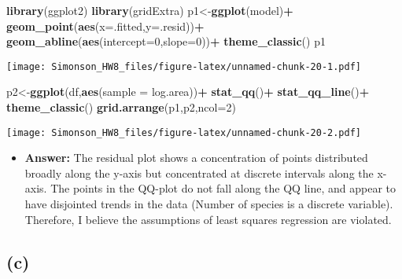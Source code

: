 \documentclass[]{article}
\newenvironment{Shaded}{\begin{snugshade}}{\end{snugshade}}
\newcommand{\KeywordTok}[1]{\textcolor[rgb]{0.13,0.29,0.53}{\textbf{#1}}}
\newcommand{\DataTypeTok}[1]{\textcolor[rgb]{0.13,0.29,0.53}{#1}}
\newcommand{\DecValTok}[1]{\textcolor[rgb]{0.00,0.00,0.81}{#1}}
\newcommand{\StringTok}[1]{\textcolor[rgb]{0.31,0.60,0.02}{#1}}
\newcommand{\OperatorTok}[1]{\textcolor[rgb]{0.81,0.36,0.00}{\textbf{#1}}}
\newcommand{\NormalTok}[1]{#1}
\providecommand{\tightlist}{%
  \setlength{\itemsep}{0pt}\setlength{\parskip}{0pt}}
\begin{document}
\begin{Shaded}
\begin{Highlighting}[]
\KeywordTok{library}\NormalTok{(ggplot2)}
\KeywordTok{library}\NormalTok{(gridExtra)}
\NormalTok{p1<-}\KeywordTok{ggplot}\NormalTok{(model)}\OperatorTok{+}
\StringTok{  }\KeywordTok{geom_point}\NormalTok{(}\KeywordTok{aes}\NormalTok{(}\DataTypeTok{x=}\NormalTok{.fitted,}\DataTypeTok{y=}\NormalTok{.resid))}\OperatorTok{+}
\StringTok{  }\KeywordTok{geom_abline}\NormalTok{(}\KeywordTok{aes}\NormalTok{(}\DataTypeTok{intercept=}\DecValTok{0}\NormalTok{,}\DataTypeTok{slope=}\DecValTok{0}\NormalTok{))}\OperatorTok{+}
\StringTok{  }\KeywordTok{theme_classic}\NormalTok{()}
\NormalTok{p1}
\end{Highlighting}
\end{Shaded}

\texttt{[image: Simonson\_HW8\_files/figure-latex/unnamed-chunk-20-1.pdf]}

\begin{Shaded}
\begin{Highlighting}[]
\NormalTok{p2<-}\KeywordTok{ggplot}\NormalTok{(df,}\KeywordTok{aes}\NormalTok{(}\DataTypeTok{sample =}\NormalTok{ log.area))}\OperatorTok{+}
\StringTok{  }\KeywordTok{stat_qq}\NormalTok{()}\OperatorTok{+}
\StringTok{  }\KeywordTok{stat_qq_line}\NormalTok{()}\OperatorTok{+}
\StringTok{  }\KeywordTok{theme_classic}\NormalTok{()}
\KeywordTok{grid.arrange}\NormalTok{(p1,p2,}\DataTypeTok{ncol=}\DecValTok{2}\NormalTok{)}
\end{Highlighting}
\end{Shaded}

\texttt{[image: Simonson\_HW8\_files/figure-latex/unnamed-chunk-20-2.pdf]}

\begin{itemize}
\tightlist
\item
  \textbf{Answer:} The residual plot shows a concentration of points
  distributed broadly along the y-axis but concentrated at discrete
  intervals along the x-axis. The points in the QQ-plot do not fall
  along the QQ line, and appear to have disjointed trends in the data
  (Number of species is a discrete variable). Therefore, I believe the
  assumptions of least squares regression are violated.
\end{itemize}

\subsection{(c)}\label{c-3}
\end{document}
